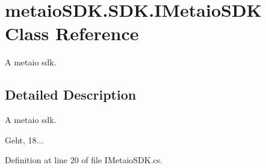 \section{metaio\-S\-D\-K.\-S\-D\-K.\-I\-Metaio\-S\-D\-K Class Reference}
\label{classmetaio_s_d_k_1_1_s_d_k_1_1_i_metaio_s_d_k}


A metaio sdk.  




\subsection{Detailed Description}
A metaio sdk. 

Geht, 18... 

Definition at line 20 of file I\-Metaio\-S\-D\-K.\-cs.

